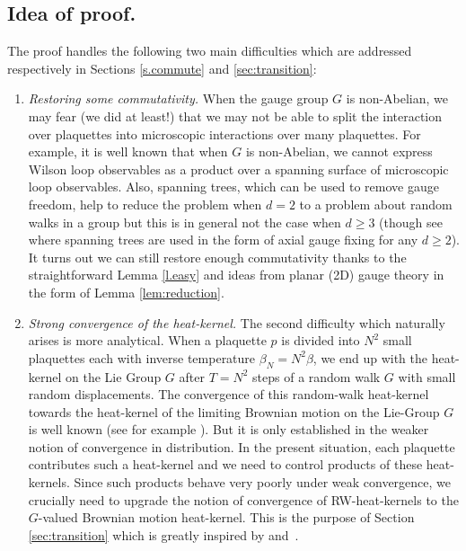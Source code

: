 \documentclass[11pt]{preprint}
\begin{document}
\subsection{Idea of proof.}
The proof handles the following two main difficulties which are addressed respectively in Sections \ref{s.commute} and \ref{sec:transition}:
\begin{enumerate}
\item {\em Restoring some commutativity.} When the gauge group $G$ is non-Abelian, we may fear (we did at least!) that we may not be able to split the interaction over plaquettes into microscopic interactions over many plaquettes. For example, it is well known that when $G$ is non-Abelian, we cannot express Wilson loop observables as a product over a spanning surface of microscopic loop observables. 
Also, spanning trees, which can be used to remove gauge freedom, help to reduce the problem when $d=2$ to a problem about random walks in a group but this is in general not the case when $d\geq 3$
(though see~\cite{chatterjee2016leading} where spanning trees are used in the form of axial gauge fixing for any $d\geq 2$).
It turns out we can still restore enough commutativity thanks to the straightforward Lemma \ref{l.easy} and ideas from planar (2D) gauge theory in the form of Lemma \ref{lem:reduction}.
\item  {\em Strong convergence of the heat-kernel.} The second difficulty which naturally arises is more analytical. When a plaquette $p$ is divided into $N^2$ small plaquettes each with inverse temperature $\beta_N = N^2 \beta$, we end up with the heat-kernel on the Lie Group $G$ after $T=N^2$ steps of a random walk $G$ with small random displacements. The convergence of this random-walk heat-kernel towards the heat-kernel of the limiting Brownian motion on the Lie-Group $G$ is well known (see for example \cite{Stroock_Varadhan_73,jorgensen1975central}).
But it is only established in the weaker notion of convergence in distribution.
In the present situation, each plaquette contributes such a heat-kernel and we need to control products of these heat-kernels.
Since such products  behave very poorly  under weak convergence, we crucially need to upgrade the notion of convergence of RW-heat-kernels to the $G$-valued Brownian motion heat-kernel.
This is the purpose of Section \ref{sec:transition} which is greatly inspired by \cite{Hebisch_Saloff_Coste_93} and~\cite{CS23}.
\end{enumerate}
\end{document}
